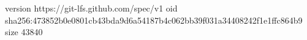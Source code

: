 version https://git-lfs.github.com/spec/v1
oid sha256:473852b0e0801cb43bda9d6a54187b4c062bb39f031a34408242f1e1ffc864b9
size 43840
